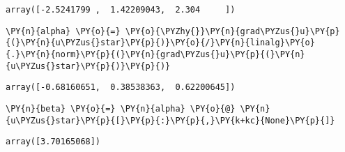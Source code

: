             \begin{tcolorbox}[breakable, size=fbox, boxrule=.5pt, pad at break*=1mm, opacityfill=0]
\begin{Verbatim}[commandchars=\\\{\}]
array([-2.5241799 ,  1.42209043,  2.304     ])
\end{Verbatim}
\end{tcolorbox}
        
    \begin{tcolorbox}[breakable, size=fbox, boxrule=1pt, pad at break*=1mm,colback=cellbackground, colframe=cellborder]
\begin{Verbatim}[commandchars=\\\{\}]
\PY{n}{alpha} \PY{o}{=} \PY{o}{\PYZhy{}}\PY{n}{grad\PYZus{}u}\PY{p}{(}\PY{n}{u\PYZus{}star}\PY{p}{)}\PY{o}{/}\PY{n}{linalg}\PY{o}{.}\PY{n}{norm}\PY{p}{(}\PY{n}{grad\PYZus{}u}\PY{p}{(}\PY{n}{u\PYZus{}star}\PY{p}{)}\PY{p}{)}
\end{Verbatim}
\end{tcolorbox}

            \begin{tcolorbox}[breakable, size=fbox, boxrule=.5pt, pad at break*=1mm, opacityfill=0]
\begin{Verbatim}[commandchars=\\\{\}]
array([-0.68160651,  0.38538363,  0.62200645])
\end{Verbatim}
\end{tcolorbox}
        
    \begin{tcolorbox}[breakable, size=fbox, boxrule=1pt, pad at break*=1mm,colback=cellbackground, colframe=cellborder]
\begin{Verbatim}[commandchars=\\\{\}]
\PY{n}{beta} \PY{o}{=} \PY{n}{alpha} \PY{o}{@} \PY{n}{u\PYZus{}star}\PY{p}{[}\PY{p}{:}\PY{p}{,}\PY{k+kc}{None}\PY{p}{]}
\end{Verbatim}
\end{tcolorbox}

            \begin{tcolorbox}[breakable, size=fbox, boxrule=.5pt, pad at break*=1mm, opacityfill=0]
\begin{Verbatim}[commandchars=\\\{\}]
array([3.70165068])
\end{Verbatim}
\end{tcolorbox}
        
